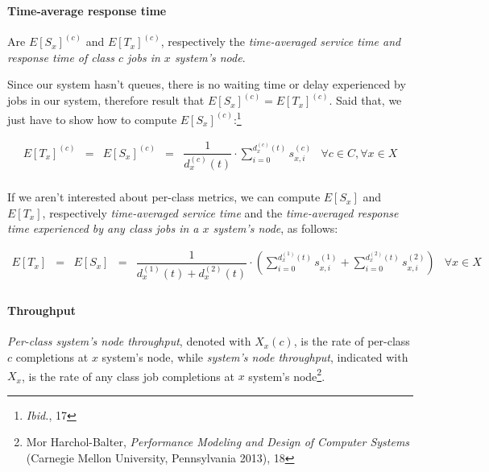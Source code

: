 \documentclass[10pt,a4paper]{article}
\begin{document}
\paragraph{Time-average response time}

Are $E[S_x]^{(c)}$ and $E[T_x]^{(c)}$, respectively the \textit{time-averaged service time and response time of class $c$ jobs in $x$ system's node}. 

Since our system hasn't queues, there is no waiting time or delay experienced by jobs in our system, therefore result that $E[S_x]^{(c)} = E[T_x]^{(c)}$.
Said that, we just have to show how to compute $E[S_x]^{(c)}$:\footnote{\textit{Ibid.}, 17}

\begin{equation}
\begin{array} {rccccr} 
E[T_x]^{(c)} & = & E[S_x]^{(c)} & = & \displaystyle \dfrac{1}{d_x^{(c)}(t)} \cdot \sum_{i = 0}^{d_x^{(c)}(t)} s_{x,i}^{(c)} & \forall c \in C, \forall x \in X \\
\end{array}
\end{equation}

If we aren't interested about per-class metrics, we can compute $E[S_x]$ and $E[T_x]$, respectively \textit{time-averaged service time} and the \textit{time-averaged response time experienced by any class jobs in a $x$ system's node}, as follows:

\begin{equation}
\begin{array} {rccccr} 
E[T_x] & = & E[S_x] & = & \displaystyle \dfrac{1}{d_x^{(1)}(t) + d_x^{(2)}(t)} \cdot \left( \sum_{i = 0}^{d_x^{(1)}(t)} s_{x,i}^{(1)} + \sum_{i = 0}^{d_x^{(2)}(t)} s_{x,i}^{(2)} \right) & \forall x \in X \\
\end{array}
\end{equation}

\paragraph{Throughput}

\textit{Per-class system's node throughput}, denoted with $X_x(c)$, is the rate of per-class $c$ completions at $x$ system's node, while \textit{system's node throughput}, indicated with $X_x$, is the rate of any class job completions at $x$ system's node\footnote{Mor Harchol-Balter, \textit{Performance Modeling and Design of Computer Systems} (Carnegie Mellon University, Pennsylvania 2013), 18}. 
\end{document}
